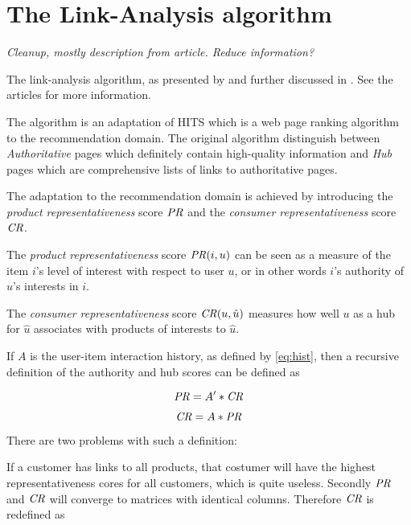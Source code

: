 \section{The Link-Analysis algorithm}\label{sec:linkanalysis}

\textit{Cleanup, mostly description from article. Reduce information?}

The link-analysis algorithm, as presented by \cite{huang2004link} and further discussed in \cite{huang2007comparison}. See the articles for more information.

The algorithm is an adaptation of HITS \cite{kleinberg1999authoritative} which is a web page ranking algorithm to the recommendation domain. The original algorithm distinguish between \textit{Authoritative} pages which definitely contain high-quality information and \textit{Hub} pages which are comprehensive lists of links to authoritative pages. \citep{huang2007comparison}

The adaptation to the recommendation domain is achieved by introducing the \textit{product representativeness} score $\mathit{PR}$ and the \textit{consumer representativeness} score $\mathit{CR}$.

The \textit{product representativeness} score $\mathit{PR}(i, u)$ can be seen as a measure of the item $i$'s level of interest with respect to user $u$, or in other words $i$'s authority of $u$'s interests in $i$.

The \textit{consumer representativeness} score $\mathit{CR}(u, \hat{u})$ measures how well $u$ as a hub for $\hat{u}$ associates with products of interests to $\hat{u}$.

If $A$ is the user-item interaction history, as defined by \ref{eq:hist}, 
then a recursive definition of the authority and hub scores can be defined as

\begin{equation}
    \mathit{PR} = A' * \mathit{CR}
\end{equation}

\begin{equation}
    \mathit{CR} = A * \mathit{PR}
\end{equation}

There are two problems with such a definition:

If a customer has links to all products, that costumer will have the highest representativeness cores for all customers, which is quite useless.  Secondly $\mathit{PR}$ and $\mathit{CR}$ will converge to matrices with identical columns.  Therefore $\mathit{CR}$ is redefined as

